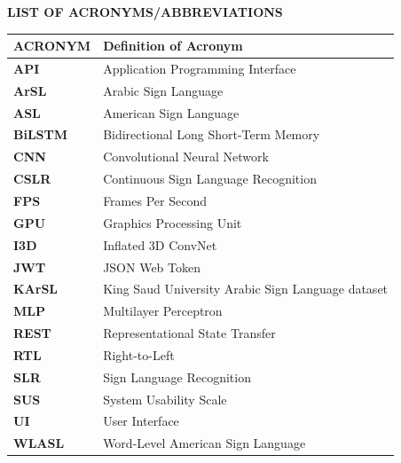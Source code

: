 \thispagestyle{plain}

\begin{center}
    {\Large \textbf{LIST OF ACRONYMS/ABBREVIATIONS}}
\end{center}
\vspace{0.8cm}

\begin{table}[H]
\centering
\renewcommand{\arraystretch}{1.5} %
\begin{tabular}{|l|l|}
\hline
\textbf{ACRONYM} & \textbf{Definition of Acronym} \\ \hline
\textbf{API} & Application Programming Interface \\ \hline
\textbf{ArSL} & Arabic Sign Language \\ \hline
\textbf{ASL} & American Sign Language \\ \hline
\textbf{BiLSTM} & Bidirectional Long Short-Term Memory \\ \hline
\textbf{CNN} & Convolutional Neural Network \\ \hline
\textbf{CSLR} & Continuous Sign Language Recognition \\ \hline
\textbf{FPS} & Frames Per Second \\ \hline
\textbf{GPU} & Graphics Processing Unit \\ \hline
\textbf{I3D} & Inflated 3D ConvNet \\ \hline
\textbf{JWT} & JSON Web Token \\ \hline
\textbf{KArSL} & King Saud University Arabic Sign Language dataset \\ \hline
\textbf{MLP} & Multilayer Perceptron \\ \hline
\textbf{REST} & Representational State Transfer \\ \hline
\textbf{RTL} & Right-to-Left \\ \hline
\textbf{SLR} & Sign Language Recognition \\ \hline
\textbf{SUS} & System Usability Scale \\ \hline
\textbf{UI} & User Interface \\ \hline
\textbf{WLASL} & Word-Level American Sign Language \\ \hline
\end{tabular}
\end{table}